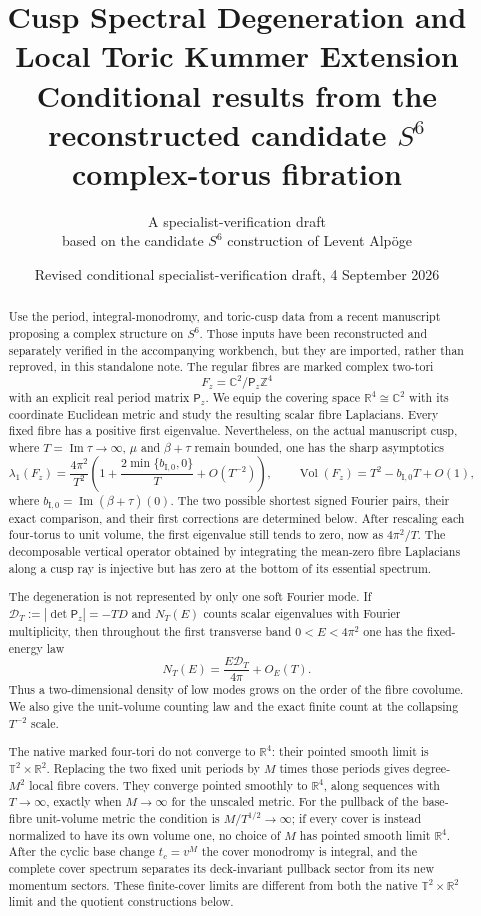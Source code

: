 \documentclass[11pt]{article}
\title{Cusp Spectral Degeneration and Local Toric Kummer Extension\\
\large Conditional results from the reconstructed candidate $S^6$
complex-torus fibration}
\author{A specialist-verification draft\\
\small based on the candidate $S^6$ construction of Levent Alp\"oge}
\date{Revised conditional specialist-verification draft, 4 September 2026}
\numberwithin{equation}{section}
\theoremstyle{definition}
\theoremstyle{remark}
\newcommand{\R}{\mathbb R}
\newcommand{\C}{\mathbb C}
\newcommand{\Z}{\mathbb Z}
\newcommand{\T}{\mathbb T}
\begin{document}
\maketitle

\begin{abstract}
Use the period, integral-monodromy, and toric-cusp data from a recent
manuscript proposing a complex structure on $S^6$.  Those inputs have been
reconstructed and separately verified in the accompanying workbench, but
they are imported, rather than reproved, in this standalone note.  The
regular fibres are marked complex two-tori
\[
 F_z=\C^2/\mathsf P_z\Z^4
\]
with an explicit real period matrix $\mathsf P_z$.  We equip the covering space $\R^4\cong\C^2$ with its coordinate Euclidean metric and study the resulting scalar fibre Laplacians.  Every fixed fibre has a positive first eigenvalue.  Nevertheless, on the actual manuscript cusp, where $T=\operatorname{Im}\tau\to\infty$, $\mu$ and $\beta+\tau$ remain bounded, one has the sharp asymptotics
\[
 \lambda_1(F_z)=\frac{4\pi^2}{T^2}
 \left(1+\frac{2\min\{b_{\mathrm I,0},0\}}{T}+O(T^{-2})\right),
 \qquad
 \operatorname{Vol}(F_z)=T^2-b_{\mathrm I,0}T+O(1),
\]
where $b_{\mathrm I,0}=\operatorname{Im}(\beta+\tau)(0)$.  The two possible shortest
signed Fourier pairs, their exact comparison, and their first corrections are
determined below.  After rescaling each four-torus to unit volume, the first
eigenvalue still tends to zero, now as $4\pi^2/T$.  The decomposable vertical
operator obtained by integrating the mean-zero fibre Laplacians along a cusp
ray is injective but has zero at the bottom of its essential spectrum.

The degeneration is not represented by only one soft Fourier mode.  If
$\mathcal D_T:=|\det\mathsf P_z|=-TD$ and $N_T(E)$ counts scalar
eigenvalues with Fourier multiplicity, then throughout the first transverse
band $0<E<4\pi^2$ one has the fixed-energy law
\[
 N_T(E)=\frac{E\mathcal D_T}{4\pi}+O_E(T).
\]
Thus a two-dimensional density of low modes grows on the order of the fibre
covolume.  We also give the unit-volume counting law and the exact finite
count at the collapsing $T^{-2}$ scale.

The native marked four-tori do not converge to $\R^4$: their pointed smooth
limit is $\T^2\times\R^2$.  Replacing the two fixed unit periods by $M$ times
those periods gives degree-$M^2$ local fibre covers.  They converge pointed
  smoothly to $\R^4$, along sequences with $T\to\infty$, exactly when
  $M\to\infty$ for the unscaled metric.  For
the pullback of the base-fibre unit-volume metric the condition is
$M/T^{1/2}\to\infty$; if every cover is instead normalized to have its own
volume one, no choice of $M$ has pointed smooth limit $\R^4$.  After the
cyclic base change $t_c=v^M$ the cover monodromy is integral, and the complete
cover spectrum separates its deck-invariant pullback sector from its new
momentum sectors.  These finite-cover limits are different from both the
native $\T^2\times\R^2$ limit and the quotient constructions below.


\end{abstract}
\end{document}
